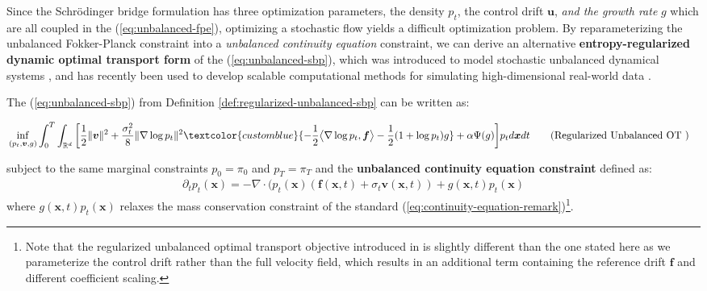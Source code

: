 \documentclass{article}
\newcommand{\bluetext}[1]{\textcolor{customblue}{#1}}
\begin{document}
Since the Schrödinger bridge formulation has three optimization parameters, the density $p_t$, the control drift $\boldsymbol{u}$, \textit{and the growth rate} $g$ which are all coupled in the (\ref{eq:unbalanced-fpe}), optimizing a stochastic flow yields a difficult optimization problem. By reparameterizing the unbalanced Fokker-Planck constraint into a \textit{unbalanced continuity equation} constraint, we can derive an alternative \textbf{entropy-regularized dynamic optimal transport form} of the (\ref{eq:unbalanced-sbp}), which was introduced to model stochastic unbalanced dynamical systems \citep{baradat2021regularized, buze2023entropic, chen2022most, janati2020entropic}, and has recently been used to develop scalable computational methods for simulating high-dimensional real-world data \citep{zhang2024learning}.

\begin{proposition}\label{prop:regularized-unbalanced-sbp}
    The (\ref{eq:unbalanced-sbp}) from Definition \ref{def:regularized-unbalanced-sbp} can be written as:
    \begin{small}
    \begin{align}
        &\inf_{(p_t, \boldsymbol{v}, g)}\int_0^T\int_{\mathbb{R}^d}\bigg[\frac{1}{2}\|\boldsymbol{v}\|^2+\frac{\sigma_t^2}{8}\|\nabla \log  p_t\|^2\bluetext{-\frac{1}{2}\big\langle\nabla\log p_t,\boldsymbol{f}\big\rangle -\frac{1}{2}(1+\log p_t)g}+\alpha\Psi(g)\bigg]p_td\boldsymbol{x}dt\tag{Regularized Unbalanced OT }
    \end{align}
    \end{small}
    subject to the same marginal constraints $p_0=\pi_0$ and $p_T=\pi_T$ and the \textbf{unbalanced continuity equation constraint} defined as:
    \begin{align}
        \partial_tp_t(\boldsymbol{x})=-\nabla\cdot(p_t(\boldsymbol{x})(\boldsymbol{f}(\boldsymbol{x},t)+\sigma_t\boldsymbol{v}(\boldsymbol{x},t))+g(\boldsymbol{x},t)p_t(\boldsymbol{x})
    \end{align}
    where $g(\boldsymbol{x},t)p_t(\boldsymbol{x})$ relaxes the mass conservation constraint of the standard (\ref{eq:continuity-equation-remark})\footnote{Note that the regularized unbalanced optimal transport objective introduced in \citep{zhang2024learning} is slightly different than the one stated here as we parameterize the control drift rather than the full velocity field, which results in an additional term containing the reference drift $\boldsymbol{f}$ and different coefficient scaling.}.
\end{proposition}
\end{document}
